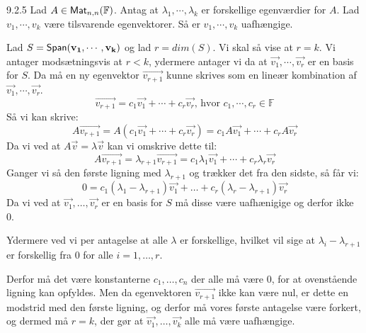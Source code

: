\begin{lemma}{9.2.5}
	Lad $A \in \textsf{Mat}_{n,n}(\mathbb{F})$. Antag at $\lambda_1, \cdots, \lambda_k$
	er forskellige egenværdier for $A$. Lad $v_1, \cdots, v_k$ være tilsvarende
	egenvektorer. Så er $v_1, \cdots, v_k$ uafhængige.
\end{lemma}
\begin{bevis}
	Lad $S = \textsf{Span}(\mathbf{v_1}, \cdots, \mathbf{v_k})$ og lad $r = dim(S)$. Vi skal 
	så vise at $r = k$. Vi antager modsætningsvis at $r < k$, ydermere antager 
	vi da at $\vec{v_1}, \cdots, \vec{v_r}$ er en basis for $S$. Da må en 
	ny egenvektor $\vec{v_{r+1}}$ kunne skrives som en lineær kombination af 
	$\vec{v_1}, \cdots, \vec{v_r}$.
	\[
		\vec{v_{r+1}} = c_1\vec{v_1} + \cdots + c_r\vec{v_r}\text{, hvor } 
		c_1, \cdots, c_r \in \mathbb{F}
	\]
	Så vi kan skrive:
	\[
		A\vec{v_{r+1}} = A(c_1\vec{v_1}+ \cdots + c_r\vec{v_r}) = 
		c_1A\vec{v_1} + \cdots + c_rA\vec{v_r}
	\]
	Da vi ved at $A\vec{v} = \lambda \vec{v}$ kan vi omskrive dette til:
	\[
		A\vec{v_{r+1}} = \lambda_{r+1}\vec{v_{r+1}} = c_1\lambda_1\vec{v_1} + 
		\cdots + c_r\lambda_r\vec{v_r}
	\]
	Ganger vi så den første ligning med $\lambda_{r+1}$ og trækker det fra den
	sidste, så får vi:
	\[
		0 = c_1(\lambda_1-\lambda_{r+1})\vec{v_1} + \dotso + 
		c_r(\lambda_r-\lambda_{r+1})\vec{v_r}
	\]
	Da vi ved at $\vec{v_1}, \dotsc, \vec{v_r}$ er en basis for $S$ må disse
	være uafhænigige og derfor ikke 0.
	
	Ydermere ved vi per antagelse at alle $\lambda$ er forskellige, hvilket vil
	sige at $\lambda_i-\lambda_{r+1}$ er forskellig fra 0 for alle $i = 1,
	\dotsc, r$. 
	
	Derfor må det være konstanterne $c_1, \dotsc, c_n$ der alle må være 0, for
	at ovenstående ligning kan opfyldes. Men da egenvektoren $\vec{v_{r+1}}$
	ikke kan være nul, er dette en modstrid med den første ligning, og derfor
	må vores første antagelse være forkert, og dermed må $r = k$, der gør at
	$\vec{v_1}, \dotsc, \vec{v_k}$ alle må være uafhængige.
\end{bevis}
